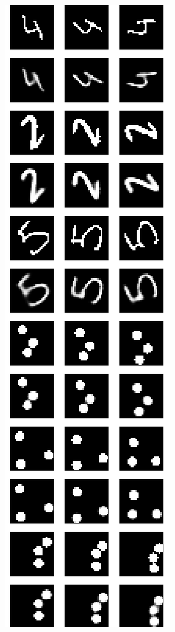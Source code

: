 \documentclass[12pt]{article}
\begin{document}
	\begin{figure}
		\begin{minipage}[position=l]{0.33\textwidth}
			\begin{mdframed}[style=inner]
				\includegraphics[scale=0.5]{Modellinput}

\end{mdframed}
\end{minipage}
\end{figure}
\end{document}
